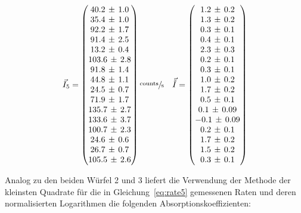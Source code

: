 \begin{equation}
	\vec{I}_5=
	\begin{pmatrix}
		40.2\,\pm\,1.0 \\
		35.4\,\pm\,1.0 \\
		92.2\,\pm\,1.7 \\
		91.4\,\pm\,2.5 \\
		13.2\,\pm\,0.4 \\
    103.6\,\pm\,2.8 \\
		91.8\,\pm\,1.4 \\
		44.8\,\pm\,1.1 \\
		24.5\,\pm\,0.7 \\
		71.9\,\pm\,1.7 \\
		135.7\,\pm\,2.7 \\
    133.6\,\pm\,3.7 \\
		100.7\,\pm\,2.3 \\
		24.6\,\pm\,0.6 \\
		26.7\,\pm\,0.7 \\
		105.5\,\pm\,2.6
	\end{pmatrix}
	\sfrac{\text{counts}}{\text{s}}\quad
	\vec{\tilde{I}}=
	\begin{pmatrix}
    1.2\,\pm\,0.2 \\
		1.3\,\pm\,0.2 \\
		0.3\,\pm\,0.1 \\
		0.4\,\pm\,0.1 \\
		2.3\,\pm\,0.3 \\
    0.2\,\pm\,0.1 \\
		0.3\,\pm\,0.1 \\
		1.0\,\pm\,0.2 \\
		1.7\,\pm\,0.2 \\
		0.5\,\pm\,0.1 \\
		0.1\,\pm\,0.09 \\
    -0.1\,\pm\,0.09 \\
		0.2\,\pm\,0.1 \\
		1.7\,\pm\,0.2 \\
		1.5\,\pm\,0.2 \\
		0.3\,\pm\,0.1
	\end{pmatrix}
	\label{eq:rate5}
\end{equation}

Analog zu den beiden Würfel 2 und 3 liefert die Verwendung der Methode der kleinsten Quadrate für die in
Gleichung~\eqref{eq:rate5} gemessenen Raten und deren normalisierten Logarithmen
die folgenden Absorptionskoeffizienten:

